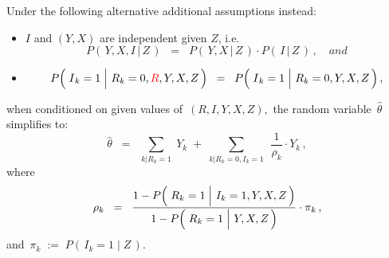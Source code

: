 \begin{proposition}
\begin{enumerate}
	Under the following alternative additional assumptions instead:
	\begin{itemize}
	\item
		$I$ and $(Y,X)$ are independent given $Z$, i.e.
		\begin{equation*}
		P\!\left(\,Y,X,I\,\vert\,Z\,\right)
		\;\; = \;\;
			P\!\left(\,Y,X\,\vert\,Z\,\right)
			\cdot
			P\!\left(\,I\,\vert\,Z\,\right)\,,
			\quad
			\textit{and}
		\end{equation*}
	\item
		\begin{equation*}
		P\!\left(\,\left.\overset{{\color{white}.}}{I}_{k} = 1\;\right\vert\,R_{k}=0,{\color{red}R},Y,X,Z\,\right)
		\;\; = \;\;
			P\!\left(\,\left.\overset{{\color{white}.}}{I}_{k} = 1\;\right\vert\,R_{k}=0,Y,X,Z\,\right),
		\end{equation*}
	\end{itemize}
	when conditioned on given values of \,$(R,I,Y,X,Z)$,\, the random variable \,$\widehat{\theta}$\, simplifies to:
	\begin{equation*}
	\widehat{\theta}
	\;\; = \;\;
		\underset{k\vert R_{k}=1}{\sum}\; Y_{k}
		\; + \;
		\underset{k\vert R_{k}=0,I_{k}=1}{\sum}\;\, \dfrac{1}{\rho_{k}}\cdot Y_{k}\,,
	\end{equation*}
	where
	\begin{equation*}
	\rho_{k}
	\;\; = \;\;
		\dfrac{
			1 - P\!\left(\,\left.\overset{{\color{white}.}}{R}_{k}=1\;\right\vert\,I_{k}=1,Y,X,Z\,\right)
			}{
			1 - P\!\left(\,\left.\overset{{\color{white}.}}{R}_{k}=1\;\right\vert\,Y,X,Z\,\right)
			}
		\cdot
		\pi_{k}\,,
	\end{equation*}
	and \,$\pi_{k} \; := \; P(\,I_{k}=1\;\vert\;Z\,)$.
\end{enumerate}
\end{proposition}
\proof
